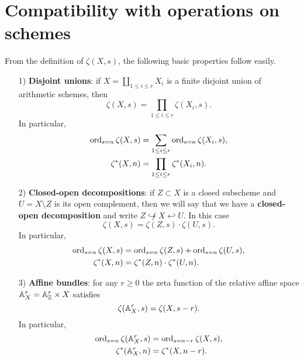 \documentclass{article}
\numberwithin{equation}{section}
\begin{document}

\section{Compatibility with operations on schemes}
\label{sec:compatibility-with-operations}

From the definition of $\zeta (X,s)$, the following basic properties follow
easily.

\begin{enumerate}
\item[1)] \textbf{Disjoint unions}: if $X = \coprod_{1 \le i \le r} X_i$ is a
  finite disjoint union of arithmetic schemes, then
  \begin{equation}
    \label{eqn:zeta-function-for-disjoint-unions}
    \zeta (X,s) = \prod_{1 \le i \le r} \zeta (X_i,s).
  \end{equation}
  In particular,
  \begin{align*}
    \operatorname{ord}_{s=n} \zeta (X,s) & = \sum_{1 \le i \le r} \operatorname{ord}_{s=n} \zeta (X_i,s), \\
    \zeta^* (X,n) & = \prod_{1 \le i \le r} \zeta^* (X_i,n).
  \end{align*}

\item[2)] \textbf{Closed-open decompositions}: if $Z \subset X$ is a closed
  subscheme and $U = X\setminus Z$ is its open complement, then we will say that
  we have a \textbf{closed-open decomposition} and write
  $Z \not\hookrightarrow X \hookleftarrow U$. In this case
  \begin{equation}
    \label{eqn:zeta-function-for-closed-open-decompositions}
    \zeta (X,s) = \zeta (Z,s) \cdot \zeta (U,s).
  \end{equation}
  In particular,
  \begin{align*}
    \operatorname{ord}_{s=n} \zeta (X,s) & = \operatorname{ord}_{s=n} \zeta (Z,s) + \operatorname{ord}_{s=n} \zeta (U,s), \\
    \zeta^* (X,n) & = \zeta^* (Z,n) \cdot \zeta^* (U,n).
  \end{align*}

\item[3)] \textbf{Affine bundles}: for any $r \ge 0$ the zeta function of the
  relative affine space $\mathbb{A}^r_X = \mathbb{A}^r_{\mathbb{Z}} \times X$ satisfies
  \begin{equation}
    \label{eqn:zeta-function-for-affine-space}
    \zeta (\AA^r_X, s) = \zeta (X, s-r).
  \end{equation}
  In particular,
  \begin{align*}
    \operatorname{ord}_{s=n} \zeta (\mathbb{A}^r_X, s) & = \operatorname{ord}_{s=n-r} \zeta (X, s), \\
    \zeta^* (\mathbb{A}^r_X, n) & = \zeta^* (X, n-r).
  \end{align*}
\end{enumerate}
\end{document}
